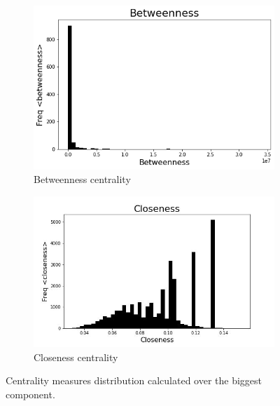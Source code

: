 \documentclass[sigchi]{acmart}
\begin{document}
\begin{figure}[]
\begin{subfigure}{.45\columnwidth}
  \centering
  \includegraphics[width=\columnwidth]{report/img/betw.png} 
  \caption{Betweenness centrality}
  \label{fig:sub-bet}
\end{subfigure}
\hfill
\begin{subfigure}{.45\columnwidth}
  \centering
  \includegraphics[width=\columnwidth]{report/img/clos.jpg}
  \caption{Closeness centrality}
  \label{fig:sub-clo}
\end{subfigure}
\hfill
\label{fig:centralities}
\caption{Centrality measures distribution calculated over the biggest component.}


\end{figure}
\end{document}
